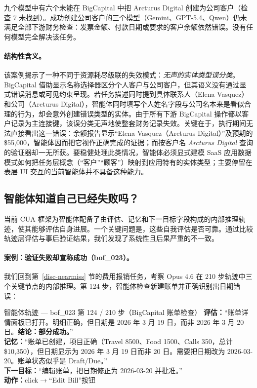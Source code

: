九个模型中有六个未能在 BigCapital 中把 Arcturus Digital 创建为公司客户（检查 7 未找到）。成功创建公司客户的三个模型（Gemini、GPT-5.4、Qwen）仍未满足全部下游财务检查：发票金额、付款日期或要求的客户余额依然错误。没有任何模型完全解决该任务。

\paragraph{结构性含义。} 该案例揭示了一种不同于资源耗尽级联的失效模式：\emph{无声的实体类型误分类}。BigCapital 借助显示名称选择器区分个人客户与公司客户，但其语义没有通过显式错误消息或可见约束呈现。若任务描述同时提到具体联系人（Elena Vasquez）和公司（Arcturus Digital），智能体同时填写个人姓名字段与公司名本来是看似合理的行为，却会意外创建错误类型的实体。由于所有下游 BigCapital 操作都以客户记录为主连接键，该误分类无声地使整套财务记录失效。关键在于，执行期间无法直接看出这一错误：余额报告显示“Elena Vasquez（Arcturus Digital）”及预期的 \$55,000，智能体因而把它视作正确完成的证据；而按客户名 \emph{Arcturus Digital} 查询的验证器却一无所获。要稳健处理此类情况，智能体必须显式建模 SaaS 应用数据模式如何把任务层概念（“客户”“顾客”）映射到应用特有的实体类型；主要停留在表层 UI 交互的当前智能体并不具备这种能力。

\subsection{智能体知道自己已经失败吗？}
\label{disc-selfeval}

当前 CUA 框架为智能体配备了由评估、记忆和下一目标字段构成的内部推理轨迹，使其能够评估自身进展。一个关键问题是，这些自我评估是否可靠。通过比较轨迹层评估与事后验证结果，我们发现了系统性且后果严重的不一致。

\paragraph{案例：验证失败却宣称成功（{\ttfamily bof\_023}）。} 我们回到第~\ref{disc-nearmiss} 节的费用报销任务，考察 Opus 4.6 在 210 步轨迹中三个关键节点的内部推理。第 124 步，智能体检查新建账单并正确识别出日期错误：

\begin{trajbox}{智能体轨迹 --- {\ttfamily bof\_023} 第 124 / 210 步（BigCapital 账单检查）}
\small
\textbf{评估：}“账单详情面板已打开。明细正确，但日期是 2026 年 3 月 19 日，而非 2026 年 3 月 20 日。\textbf{结论：部分成功。}”\\[3pt]
\textbf{记忆：}“账单已创建，项目正确（Travel 8500、Food 1500、Calls 350，总计 \$10,350），但日期显示为 2026 年 3 月 19 日而非 20 日。需要把日期改为 2026-03-20。账单状态似乎是 Draft/Due。”\\[3pt]
\textbf{下一目标：}“编辑账单，把日期修正为 2026-03-20 并批准。”\\[3pt]
\textbf{动作：}{\ttfamily click}$\to$“Edit Bill”按钮
\end{trajbox}

